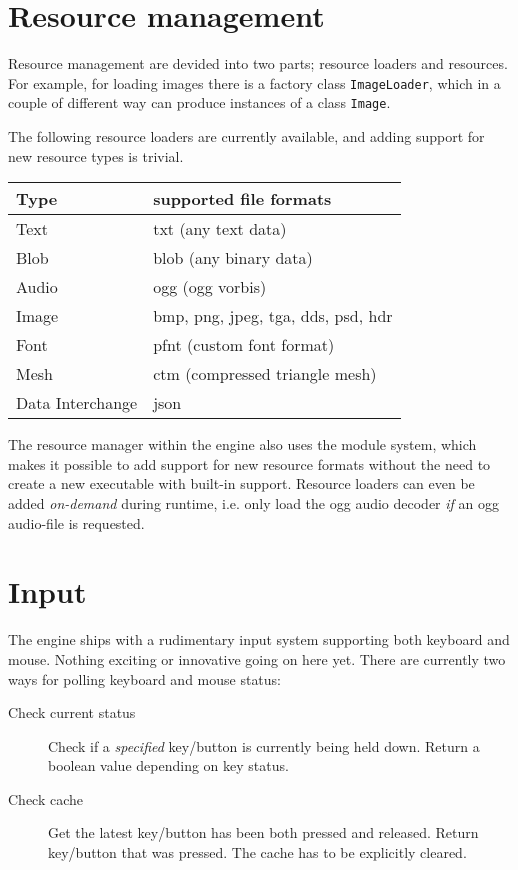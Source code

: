 \section{Resource management}
Resource management are devided into two parts; resource loaders and resources. For example, for loading images
there is a factory class \texttt{ImageLoader}, which in a couple of different way can produce instances of a class \texttt{Image}.

The following resource loaders are currently available, and adding support for new resource types is trivial.


\begin{tabular}{l l}
\textbf{Type}    & \textbf{supported file formats}\\
\hline
Text    & txt  (any text data)                  \\
Blob    & blob (any binary data)                \\
Audio   & ogg  (ogg vorbis)                     \\
Image   & bmp, png, jpeg, tga, dds, psd, hdr    \\
Font    & pfnt (custom font format)             \\
Mesh    & ctm  (compressed triangle mesh)       \\
Data Interchange & json                         \\
\end{tabular}


The resource manager within the engine also uses the module system, which makes it possible to add support for new resource formats without the need to create a new executable with built-in support. Resource loaders can even be added \textit{on-demand} during runtime, i.e. only load the ogg audio decoder \textit{if} an ogg audio-file is requested.

\newpage

\section{Input}
The engine ships with a rudimentary input system supporting both keyboard and mouse. Nothing exciting or
innovative going on here yet. There are currently two ways for polling keyboard and mouse status:

\begin{description}
\item[Check current status] Check if a \textit{specified} key/button is currently being held down. Return a boolean value depending on key status.
\item[Check cache] Get the latest key/button has been both pressed and released. Return key/button that was pressed. The cache has to be explicitly cleared.
\end{description}
 
